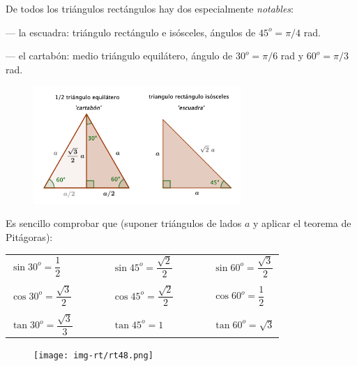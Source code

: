 De todos los triángulos rectángulos hay dos especialmente \emph{notables}:

--- la escuadra: triángulo rectángulo e isósceles, ángulos de $45^o = \pi/4$ rad.

--- el cartabón: medio triángulo equilátero, ángulo de $30^o = \pi/6$ rad y $60^o=\pi/3$ rad.

\begin{figure}[H]
	\centering
	\includegraphics[width=0.7\textwidth]{img-rt/rt06.png}
\end{figure}


Es sencillo comprobar que \textcolor{gris}{(suponer triángulos de lados $a$ y aplicar el teorema de Pitágoras)}:


\vspace{4mm}
\begin{adjustwidth}{50pt}{50pt}
\begin{cuadro-naranja}
\begin{table}[H]
\centering
\begin{tabular}{lllll}
$\sin 30^o = \dfrac 1 2$  & $\qquad$ & $\sin 45^o=\dfrac{\sqrt{2}}{2}$ & $\qquad$  & $\sin 60^o=\dfrac{\sqrt{3}}{2}$ \\
 &  &  &  &  \\
$\cos 30^o=\dfrac{\sqrt{3}}{2}$ &  & $\cos 45^o=\dfrac{\sqrt{2}}{2}$ &  & $\cos 60^o=\dfrac 1 2 $ \\
 &  &  &  &  \\
$\tan 30^o=\dfrac{\sqrt{3}}{3}$ &  & $\tan 45^o=1$ &  & $\tan 60^o=\sqrt{3}$
\end{tabular}
\end{table}
\vspace{-5mm}
\end{cuadro-naranja}
\end{adjustwidth}

\begin{figure}[H]
	\centering
	\texttt{[image: img-rt/rt48.png]}
\end{figure}


